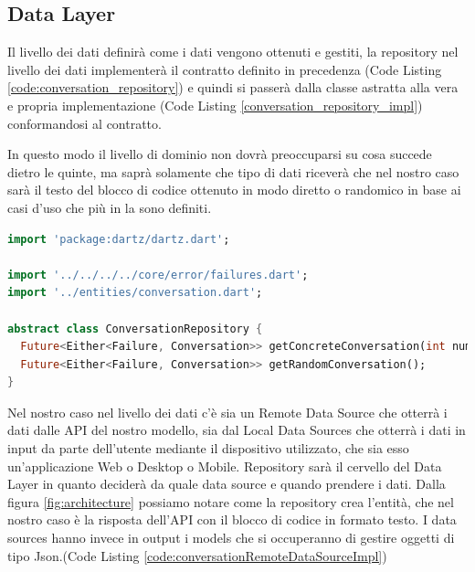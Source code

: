 \subsection{Data Layer}
Il livello dei dati definirà come i dati vengono ottenuti e gestiti, la repository nel livello dei dati implementerà il contratto definito in precedenza (Code Listing \ref{code:conversation_repository}) e quindi si passerà dalla classe astratta alla vera e propria implementazione (Code Listing \ref{conversation_repository_impl}) conformandosi al contratto.

In questo modo il livello di dominio non dovrà preoccuparsi su cosa succede dietro le quinte, ma saprà solamente che tipo di dati riceverà che nel nostro caso sarà il testo del blocco di codice ottenuto in modo diretto o randomico in base ai casi d'uso che più in la sono definiti. 

\begin{lstlisting}[language=dart,caption=Domain Layer:conversation\_repository.dart,label=code:conversation_repository]
import 'package:dartz/dartz.dart';

import '../../../../core/error/failures.dart';
import '../entities/conversation.dart';

abstract class ConversationRepository {
  Future<Either<Failure, Conversation>> getConcreteConversation(int number);
  Future<Either<Failure, Conversation>> getRandomConversation();
}
\end{lstlisting}

Nel nostro caso nel livello dei dati c'è sia un Remote Data Source che otterrà i dati dalle API del nostro modello, sia dal Local Data Sources che otterrà i dati in input da parte dell'utente mediante il dispositivo utilizzato, che sia esso un'applicazione Web o Desktop o Mobile. Repository sarà il cervello del Data Layer in quanto deciderà da quale data source e quando prendere i dati. Dalla figura \ref{fig:architecture} possiamo notare come la repository crea l'entità, che nel nostro caso è la risposta dell'API con il blocco di codice in formato testo. I data sources hanno invece in output i models che si occuperanno di gestire oggetti di tipo Json.(Code Listing \ref{code:conversationRemoteDataSourceImpl})

